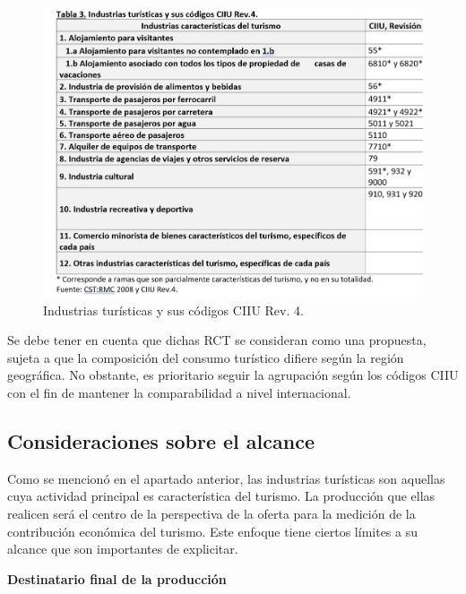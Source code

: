 \documentclass[
  openany]{book}
\begin{document}
\begin{figure}

{\centering \includegraphics[width=0.8\linewidth]{imagenes/figura1.2} 

}

\caption{Industrias turísticas y sus códigos CIIU Rev. 4.}\label{fig:ciiu2}
\end{figure}

Se debe tener en cuenta que dichas RCT se consideran como una propuesta, sujeta a que la composición del consumo turístico difiere según la región geográfica. No obstante, es prioritario seguir la agrupación según los códigos CIIU con el fin de mantener la comparabilidad a nivel internacional.

\hypertarget{consideraciones-sobre-el-alcance}{%
\subsection{Consideraciones sobre el alcance}\label{consideraciones-sobre-el-alcance}}

Como se mencionó en el apartado anterior, las industrias turísticas son aquellas cuya actividad principal es característica del turismo. La producción que ellas realicen será el centro de la perspectiva de la oferta para la medición de la contribución económica del turismo. Este enfoque tiene ciertos límites a su alcance que son importantes de explicitar.

\textbf{Destinatario final de la producción}
\end{document}
